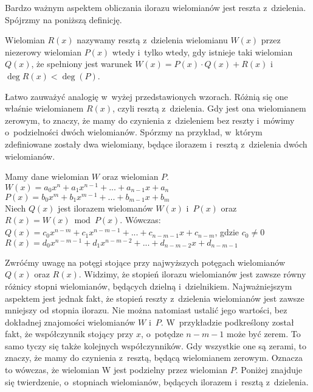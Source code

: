 Bardzo ważnym aspektem obliczania ilorazu wielomianów jest reszta z~dzielenia. Spójrzmy na poniższą definicję.

\begin{definition}
	$ $\\
	Wielomian $R(x)$ nazywamy resztą z~dzielenia wielomianu $W(x)$ przez niezerowy wielomian $P(x)$ wtedy i~tylko wtedy, gdy istnieje taki wielomian $Q(x)$, że spełniony jest warunek $W(x) = P(x) \cdot Q(x) + R(x)$ i~$\deg R(x) < \deg(P)$.
\end{definition}

Łatwo zauważyć analogię w~wyżej przedstawionych wzorach. Różnią się one właśnie wielomianem $R(x)$, czyli resztą z~dzielenia. Gdy jest ona wielomianem zerowym, to znaczy, że mamy do czynienia z~dzieleniem bez reszty i~mówimy o~podzielności dwóch wielomianów. Spórzmy na przykład, w~którym zdefiniowane zostały dwa wielomiany, będące ilorazem i~resztą z~dzielenia dwóch wielomianów.

\begin{example}
	$ $\\
	Mamy dane wielomian $W$ oraz wielomian $P$. \\
	$W(x) = a_0x^n + a_1x^{n-1} + ... + a_{n-1}x + a_n$ \\
	$P(x) = b_0x^m + b_1x^{m-1} + ... + b_{m-1}x + b_m$ \\
	Niech $Q(x)$ jest ilorazem wielomanów $W(x)$ i~$P(x)$ oraz $R(x) = W(x)\bmod P(x)$. Wówczas: \\
	$Q(x) = c_0x^{n-m} + c_1x^{n-m-1} + ... + c_{n-m-1}x + c_{n-m}$, gdzie $c_0\ne 0$ \\
	$R(x) = d_0x^{n-m-1} + d_1x^{n-m-2} + ... + d_{n-m-2}x + d_{n-m-1}$
\end{example}

Zwróćmy uwagę na potęgi stojące przy najwyższych potęgach wielomianów $Q(x)$ oraz $R(x)$. Widzimy, że stopień ilorazu wielomianów jest zawsze równy różnicy stopni wielomianów, będących dzielną i~dzielnikiem. Najważniejszym aspektem jest jednak fakt, że stopień reszty z~dzielenia wielomianów jest zawsze mniejszy od stopnia ilorazu. Nie można natomiast ustalić jego wartości, bez dokładnej znajomości wielomianów $W$ i~$P$. W~przykładzie podkreślony został fakt, że współczynnik stojący przy $x$, o~potędze $n-m-1$ może być zerem. To samo tyczy się także kolejnych współczynników. Gdy wszystkie one są zerami, to znaczy, że mamy do czynienia z~resztą, będącą wielomianem zerowym. Oznacza to wówczas, że wielomian W jest podzielny przez wielomian $P$. Poniżej znajduje się twierdzenie, o~stopniach wielomianów, będących ilorazem i~resztą z~dzielenia.

